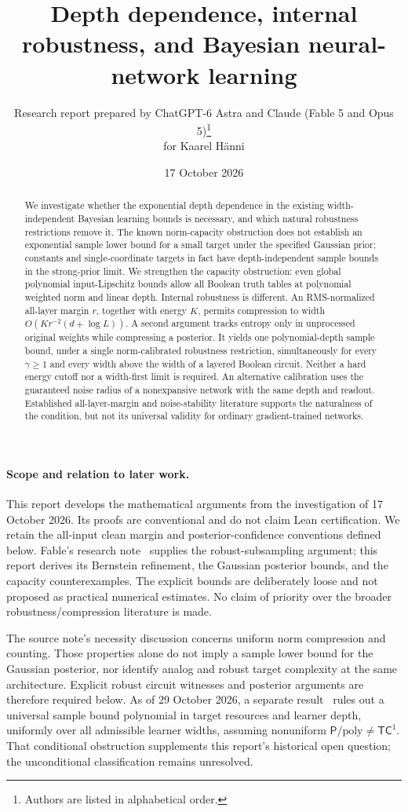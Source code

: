\documentclass[11pt]{article}
\title{Depth dependence, internal robustness, and Bayesian neural-network learning}
\author{Research report prepared by ChatGPT-6 Astra and Claude (Fable 5 and Opus 5)\thanks{Authors are listed in alphabetical order.}\\for Kaarel H\"anni}
\date{17 October 2026}
\begin{document}
\maketitle
\begin{abstract}
We investigate whether the exponential depth dependence in the existing
width-independent Bayesian learning bounds is necessary, and which natural
robustness restrictions remove it. The known norm-capacity obstruction does
not establish an exponential sample lower bound for a small target under the
specified Gaussian prior; constants and single-coordinate targets in fact
have depth-independent sample bounds in the strong-prior limit.
We strengthen the capacity obstruction: even global
polynomial input-Lipschitz bounds allow all Boolean truth tables at polynomial
weighted norm and linear depth. Internal robustness is different. An
RMS-normalized all-layer margin $r$, together with energy $K$, permits
compression to width $O(Kr^{-2}(d+\log L))$. A second argument tracks entropy
only in unprocessed original weights while compressing a posterior. It yields
one polynomial-depth sample bound, under a single norm-calibrated robustness
restriction, simultaneously for every $\gamma\ge1$ and every width above the
width of a layered Boolean circuit. Neither a hard energy cutoff nor a
width-first limit is required. An alternative calibration uses the guaranteed
noise radius of a nonexpansive network with the same depth and readout.
Established all-layer-margin
and noise-stability literature supports the naturalness of the condition,
but not its universal validity for ordinary gradient-trained networks.
\end{abstract}

\paragraph{Scope and relation to later work.}
This report develops the mathematical arguments from the investigation of
17 October 2026. Its proofs are conventional and do not claim Lean
certification. We retain the all-input clean margin and posterior-confidence
conventions defined below. Fable's research note~\cite{fable}
supplies the robust-subsampling argument; this report derives its Bernstein
refinement, the Gaussian posterior bounds, and the capacity counterexamples.
The explicit bounds are deliberately loose and not proposed as practical
numerical estimates.
No claim of priority over the broader robustness/compression literature is made.

The source note's necessity discussion concerns uniform norm compression
and counting. Those properties alone do not imply a sample lower bound
for the Gaussian posterior, nor identify analog and robust target complexity
at the same architecture. Explicit robust circuit witnesses and posterior
arguments are therefore required below. As of 29 October 2026, a separate
result~\cite{conditional2026} rules out a universal sample bound polynomial
in target resources and learner depth, uniformly over all admissible learner
widths, assuming nonuniform $\mathsf P/\mathrm{poly}\ne\mathsf{TC}^1$.
That conditional obstruction supplements this report's historical open
question; the unconditional classification remains unresolved.
\end{document}
